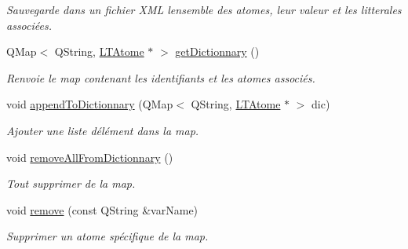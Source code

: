 \begin{DoxyCompactItemize}
\begin{DoxyCompactList}\small\item\em Sauvegarde dans un fichier X\+ML l\textquotesingle{}ensemble des atomes, leur valeur et les litterales associées. \end{DoxyCompactList}\item 
Q\+Map$<$ Q\+String, \hyperlink{class_l_t_atome}{L\+T\+Atome} $\ast$ $>$ \hyperlink{class_l_t_atome_manager_a9c7bc8f2fac1077d598d46c9d8a2d45d}{get\+Dictionnary} ()
\begin{DoxyCompactList}\small\item\em Renvoie le map contenant les identifiants et les atomes associés. \end{DoxyCompactList}\item 
void \hyperlink{class_l_t_atome_manager_ad172ad7d721b601757ec52ac63015806}{append\+To\+Dictionnary} (Q\+Map$<$ Q\+String, \hyperlink{class_l_t_atome}{L\+T\+Atome} $\ast$ $>$ dic)
\begin{DoxyCompactList}\small\item\em Ajouter une liste d\textquotesingle{}élément dans la map. \end{DoxyCompactList}\item 
void \hyperlink{class_l_t_atome_manager_a28b0da19fc580b243efc9f12251ee19a}{remove\+All\+From\+Dictionnary} ()\hypertarget{class_l_t_atome_manager_a28b0da19fc580b243efc9f12251ee19a}{}\label{class_l_t_atome_manager_a28b0da19fc580b243efc9f12251ee19a}

\begin{DoxyCompactList}\small\item\em Tout supprimer de la map. \end{DoxyCompactList}\item 
void \hyperlink{class_l_t_atome_manager_aa7c87e6c6afe1331962a6992dd5dfd97}{remove} (const Q\+String \&var\+Name)
\begin{DoxyCompactList}\small\item\em Supprimer un atome spécifique de la map. \end{DoxyCompactList}\end{DoxyCompactItemize}
